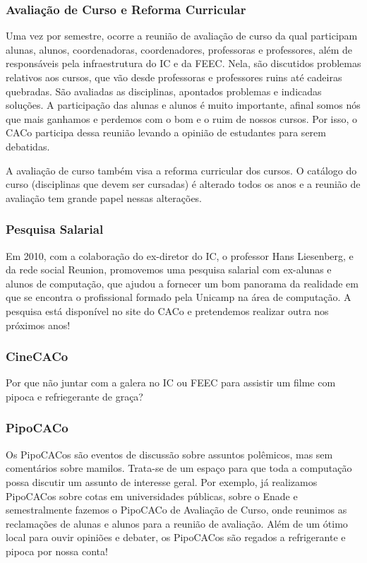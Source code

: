 \subsubsection{Avaliação de Curso e Reforma Curricular}

Uma vez por semestre, ocorre a reunião de avaliação de curso da qual participam
alunas, alunos, coordenadoras, coordenadores, professoras e professores, além
de responsáveis pela infraestrutura do IC e da FEEC. Nela, são discutidos
problemas relativos aos cursos, que vão desde professoras e professores ruins
até cadeiras quebradas. São avaliadas as disciplinas, apontados problemas e
indicadas soluções. A participação das alunas e alunos é muito importante,
afinal somos nós que mais ganhamos e perdemos com o bom e o ruim de nossos
cursos. Por isso, o CACo participa dessa reunião levando a opinião de
estudantes para serem debatidas.

A avaliação de curso também visa a reforma curricular dos cursos. O catálogo do
curso (disciplinas que devem ser cursadas) é alterado todos os anos e a reunião
de avaliação tem grande papel nessas alterações.

\subsubsection{Pesquisa Salarial}

Em 2010, com a colaboração do ex-diretor do IC, o professor Hans Liesenberg, e
da rede social Reunion, promovemos uma pesquisa salarial com ex-alunas e alunos
de computação, que ajudou a fornecer um bom panorama da realidade em que se
encontra o profissional formado pela Unicamp na área de computação. A pesquisa
está disponível no site do CACo e pretendemos realizar outra nos próximos anos!

\subsubsection{CineCACo}

Por que não juntar com a galera no IC ou FEEC para assistir um filme com pipoca
e refriegerante de graça?

\subsubsection{PipoCACo}

Os PipoCACos são eventos de discussão sobre assuntos polêmicos, mas sem
comentários sobre mamilos. Trata-se de um espaço para que toda a computação
possa discutir um assunto de interesse geral. Por exemplo, já realizamos
PipoCACos sobre cotas em universidades públicas, sobre o Enade e semestralmente
fazemos o PipoCACo de Avaliação de Curso, onde reunimos as reclamações de
alunas e alunos para a reunião de avaliação. Além de um ótimo local para ouvir
opiniões e debater, os PipoCACos são regados a refrigerante e pipoca por nossa
conta!

